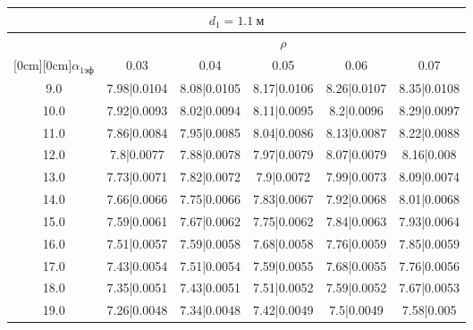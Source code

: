 \documentclass[20pt]{article}
\begin{document}
\begin{center}
\begin{tabular}{c|ccccc}
\hline
	\multicolumn{6}{c}{$d_{1}=1.1 \ м$} \\
\hline
	 & \multicolumn{5}{|c}{$\rho$} \\
	\cline{2-6}
	\raisebox{1.5ex}[0cm][0cm]{$\alpha_{1эф}$} & 0.03 & 0.04 & 0.05 & 0.06 & 0.07\\
\hline
	9.0 & 	7.98|0.0104 & 	8.08|0.0105 & 	8.17|0.0106 & 	8.26|0.0107 & 	8.35|0.0108\\
	10.0 & 	7.92|0.0093 & 	8.02|0.0094 & 	8.11|0.0095 & 	8.2|0.0096 & 	8.29|0.0097\\
	11.0 & 	7.86|0.0084 & 	7.95|0.0085 & 	8.04|0.0086 & 	8.13|0.0087 & 	8.22|0.0088\\
	12.0 & 	7.8|0.0077 & 	7.88|0.0078 & 	7.97|0.0079 & 	8.07|0.0079 & 	8.16|0.008\\
	13.0 & 	7.73|0.0071 & 	7.82|0.0072 & 	7.9|0.0072 & 	7.99|0.0073 & 	8.09|0.0074\\
	14.0 & 	7.66|0.0066 & 	7.75|0.0066 & 	7.83|0.0067 & 	7.92|0.0068 & 	8.01|0.0068\\
	15.0 & 	7.59|0.0061 & 	7.67|0.0062 & 	7.75|0.0062 & 	7.84|0.0063 & 	7.93|0.0064\\
	16.0 & 	7.51|0.0057 & 	7.59|0.0058 & 	7.68|0.0058 & 	7.76|0.0059 & 	7.85|0.0059\\
	17.0 & 	7.43|0.0054 & 	7.51|0.0054 & 	7.59|0.0055 & 	7.68|0.0055 & 	7.76|0.0056\\
	18.0 & 	7.35|0.0051 & 	7.43|0.0051 & 	7.51|0.0052 & 	7.59|0.0052 & 	7.67|0.0053\\
	19.0 & 	7.26|0.0048 & 	7.34|0.0048 & 	7.42|0.0049 & 	7.5|0.0049 & 	7.58|0.005\\
\end{tabular}


\end{center}
\end{document}
